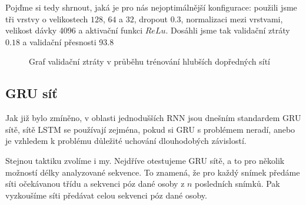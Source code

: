 Pojďme si tedy shrnout, jaká je pro nás nejoptimálnější konfigurace: použili
jsme tři vrstvy o velikostech $128$, $64$ a $32$, dropout $0.3$, normalizaci
mezi vrstvami, velikost dávky 4096 a aktivační funkci $ReLu$. Dosáhli jsme tak
validační ztráty $0.18$ a validační přesnosti 93.8%

\begin{figure}[]
    \centering
    \caption{Graf validační ztráty v průběhu trénování hlubších dopředných sítí }
    \label{graph:deepffnn}
\end{figure}

\subsection{GRU síť}

Jak již bylo zmíněno, v oblasti jednodušších RNN jsou dnešním standardem GRU
sítě, sítě LSTM se používají zejména, pokud si GRU s problémem neradí, anebo je
vzhledem k problému důležité uchování dlouhodobých závislostí.

Stejnou taktiku zvolíme i my. Nejdříve otestujeme GRU sítě, a to pro několik
možností délky analyzované sekvence. To znamená, že pro každý snímek předáme
síti očekávanou třídu a sekvenci póz dané osoby z $n$ posledních snímků. Pak
vyzkoušíme síti předávat celou sekvenci póz dané osoby.

